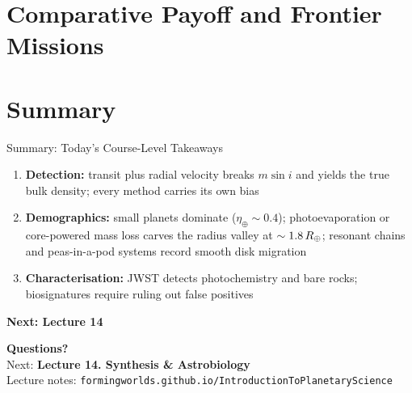 \documentclass[aspectratio=169, 11pt]{beamer}
\begin{document}
\section{Comparative Payoff and Frontier Missions}

\begin{frame}
\end{frame}


\section*{Summary}

\begin{frame}{Summary: Today's Course-Level Takeaways}
  \begin{enumerate}\setlength\itemsep{6pt}
    \item \textbf{Detection:} transit plus radial velocity breaks $m \sin i$ and yields the true bulk density; every method carries its own bias
    \item \textbf{Demographics:} small planets dominate ($\eta_\oplus \sim 0.4$); photoevaporation or core-powered mass loss carves the radius valley at $\sim 1.8\,R_{\oplus}$; resonant chains and peas-in-a-pod systems record smooth disk migration
    \item \textbf{Characterisation:} JWST detects photochemistry and bare rocks; biosignatures require ruling out false positives
  \end{enumerate}
  \vskip6pt
  \textbf{Next: Lecture 14}
\end{frame}

\begin{frame}
  \vfill
  \begin{center}
    {\color{white}\Huge \textbf{Questions?}}\\[14pt]
    {\color{white}\large Next: \textbf{Lecture 14. Synthesis \& Astrobiology}}\\[10pt]
    {\color{white}\normalsize Lecture notes: \texttt{formingworlds.github.io/IntroductionToPlanetaryScience}}
  \end{center}
  \vfill
\end{frame}
\end{document}
